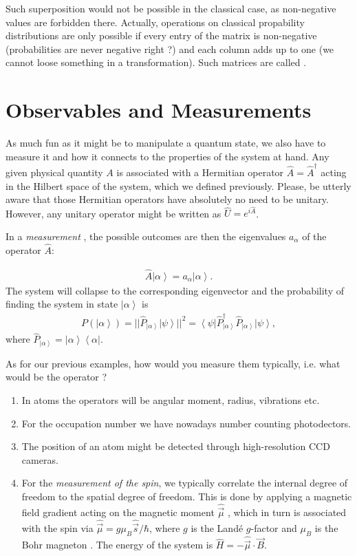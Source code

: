 \documentclass[10pt]{article}
\newcommand{\bra}[1]{\ensuremath{\left\langle#1\right|}}
\newcommand{\ket}[1]{\ensuremath{\left|#1\right\rangle}}
\begin{document}
Such superposition would not be possible in the classical case, as non-negative values are forbidden there. Actually, operations on classical propability distributions are only possible if every entry of the matrix is non-negative (probabilities are never negative right ?) and each column adds up to one (we cannot loose something in a transformation). Such matrices are called .

\section{Observables and Measurements}
As much fun as it might be to manipulate a quantum state, we also have to measure it and how it connects to the properties of the system at hand. Any given physical quantity $A$ is associated with a Hermitian operator $\hat{A} = \hat{A}^\dag$ acting in the Hilbert space of the system, which we defined previously. Please, be utterly aware that those Hermitian operators have absolutely no need to be unitary. However, any unitary operator might be written as $\hat{U}= e^{i\hat{A}}$.

In a \emph{measurement} , the possible outcomes are then the eigenvalues $a_\alpha$  of the operator $\hat{A}$:

\begin{align}
\hat{A}\ket{\alpha}=a_{\alpha}\ket{\alpha}.
\end{align}
The system will collapse to the corresponding eigenvector and the probability of finding the system in state $\ket{\alpha}$ is
\begin{align}
P(\ket{\alpha})=||\hat{P}_{\ket{\alpha}} \ket{\psi}||^2 = \bra{\psi} \hat{P}^{\dag}_{\ket{\alpha}} \hat{P}_{\ket{\alpha}} \ket{\psi},
\end{align}
where $\hat{P}_{\ket{\alpha}}= \ket{\alpha} \bra{\alpha}$.

As for our previous examples, how would you measure them typically, i.e. what would be the operator ?
\begin{enumerate}
\item In atoms the operators will be angular moment, radius, vibrations etc.
\item For the occupation number we have nowadays number counting photodectors.
\item The position of an atom might be detected through high-resolution CCD cameras.
\item For the \textit{measurement of the spin}, we typically correlate the internal degree of freedom to the spatial degree of freedom. This is done by applying a magnetic field gradient acting on the magnetic moment $\hat{\vec{\mu}}$ , which in turn is associated with the spin via $\hat{\vec{\mu}} = g \mu_B \hat{\vec{s}}/\hbar$, where $g$ is the Landé $g$-factor  and $\mu_B$ is the Bohr magneton . The energy of the system is $\hat{H} = -\hat{\vec{\mu}} \cdot \vec{B}$.
\end{enumerate}
\end{document}
